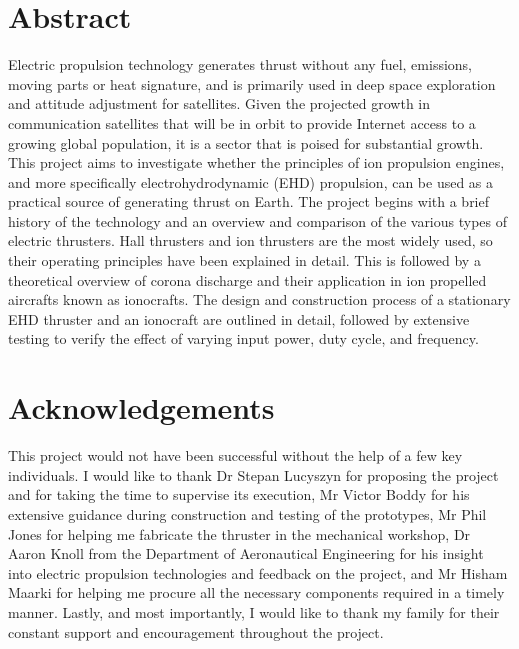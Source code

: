 \documentclass[11pt]{article}
\begin{document}
\tableofcontents
\pagebreak

\section{Abstract}

Electric propulsion technology generates thrust without any fuel, emissions, moving parts or heat signature, and is primarily used in deep space exploration and attitude adjustment for satellites. Given the projected growth in communication satellites that will be in orbit to provide Internet access to a growing global population, it is a sector that is poised for substantial growth. This project aims to investigate whether the principles of ion propulsion engines, and more specifically electrohydrodynamic (EHD) propulsion, can be used as a practical source of generating thrust on Earth. The project begins with a brief history of the technology and an overview and comparison of the various types of electric thrusters. Hall thrusters and ion thrusters are the most widely used, so their operating principles have been explained in detail. This is followed by a theoretical overview of corona discharge and their application in ion propelled aircrafts known as ionocrafts. The design and construction process of a stationary EHD thruster and an ionocraft are outlined in detail, followed by extensive testing to verify the effect of varying input power, duty cycle, and frequency.  

\pagebreak

\section{Acknowledgements}

This project would not have been successful without the help of a few key individuals. I would like to thank Dr Stepan Lucyszyn for proposing the project and for taking the time to supervise its execution, Mr Victor Boddy for his extensive guidance during construction and testing of the prototypes, Mr Phil Jones for helping me fabricate the thruster in the mechanical workshop, Dr Aaron Knoll from the Department of Aeronautical Engineering for his insight into electric propulsion technologies and feedback on the project, and Mr Hisham Maarki for helping me procure all the necessary components required in a timely manner. Lastly, and most importantly, I would like to thank my family for their constant support and encouragement throughout the project.
\end{document}
